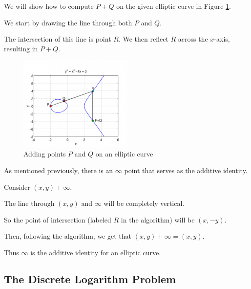 \begin{example}

    We will show how to compute $P + Q$ on the given elliptic curve in Figure \ref{adding}.

    We start by drawing the line through both $P$ and $Q$.

    The intersection of this line is point $R$.  We then reflect $R$ across the
    $x$-axis, resulting in $P + Q$.

    \begin{figure}[H]
        \caption{Adding points $P$ and $Q$ on an elliptic curve \cite{kakaroto}}\label{adding}
        \centering
        \includegraphics[width=0.5\textwidth]{elliptic_curve_addition.png}
    \end{figure}

\end{example}





\begin{example}
As mentioned previously, there is an $\infty$ point that serves as the additive identity.

Consider $(x,y) + \infty$.

The line through $(x,y)$ and $\infty$ will be completely vertical.

So the point of intersection (labeled $R$ in the algorithm) will be $(x,-y)$.

Then, following the algorithm, we get that $(x,y) + \infty = (x,y)$.

Thus $\infty$ is the additive identity for an elliptic curve.
\end{example}




\subsection{The Discrete Logarithm Problem}

